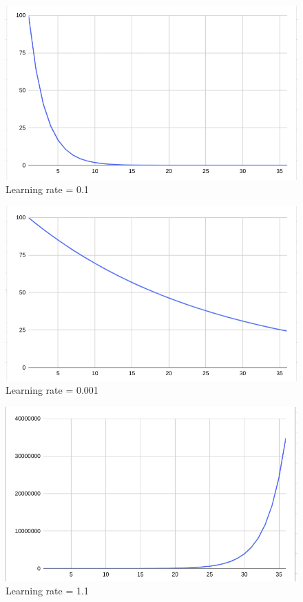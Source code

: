 \documentclass{article}
\begin{document}
\begin{figure}[H]
    \centering
    \includegraphics[width=0.75\linewidth]{image/lr01.png}
    \caption{Learning rate = 0.1}
    \label{fig:lr01}
\end{figure}


\begin{figure}[H]
    \centering
    \includegraphics[width=0.75\linewidth]{image/lr001.png}
    \caption{Learning rate = 0.001}
    \label{fig:lr001}
\end{figure}

\begin{figure}[H]
    \centering
    \includegraphics[width=0.75\linewidth]{image/lr11.png}
    \caption{Learning rate = 1.1}
    \label{fig:lr11}
\end{figure}
\end{document}
